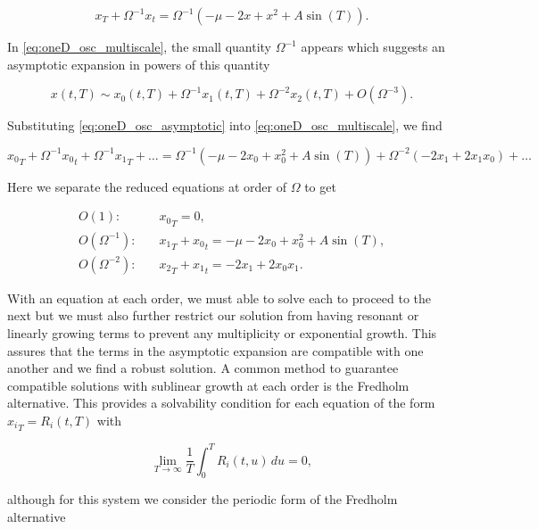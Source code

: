 \begin{equation}\label{eq:oneD_osc_multiscale}
x_T+\Omega^{-1}x_t=\Omega^{-1}\left(-\mu-2x+x^2+A\sin(T)\right).
\end{equation}

In \eqref{eq:oneD_osc_multiscale}, the small quantity $\Omega^{-1}$ appears which suggests an asymptotic expansion in powers of this quantity

\begin{equation}\label{eq:oneD_osc_asymptotic}
x(t,T)\sim x_0(t,T)+\Omega^{-1}x_1(t,T)+\Omega^{-2}x_2(t,T)+O(\Omega^{-3}).
\end{equation}

Substituting \eqref{eq:oneD_osc_asymptotic} into \eqref{eq:oneD_osc_multiscale}, we find

\begin{equation*}
{x_0}_T+\Omega^{-1}{x_0}_t+\Omega^{-1}{x_1}_T+\ldots=\Omega^{-1}(-\mu-2x_0+x_0^2+A\sin(T))+\Omega^{-2}(-2x_1+2x_1x_0)+\ldots
\end{equation*}

Here we separate the reduced equations at order of $\Omega$ to get

\begin{align}
\label{eq:oneD_osc_outerO1}
O(1):& \quad {x_0}_T=0, \\
\label{eq:oneD_osc_outerO2}
O(\Omega^{-1}):& \quad {x_1}_T+{x_0}_t =-\mu-2x_0+x_0^2+A\sin(T),\\
\label{eq:oneD_osc_outerO3}
O(\Omega^{-2}):& \quad {x_2}_T + {x_1}_t= -2x_1+2x_0 x_1.
\end{align}

With an equation at each order, we must able to solve each to proceed to the next but we must also further restrict our solution from having resonant or linearly growing terms to prevent any multiplicity or exponential growth. This assures that the terms in the asymptotic expansion are compatible with one another and we find a robust solution. A common method to guarantee compatible solutions with sublinear growth at each order is the Fredholm alternative. This provides a solvability condition for each equation of the form ${x_i}_T=R_i(t,T)$ with

\begin{equation*}
\lim\limits_{T\to\infty}\frac{1}{T}\int_0^T R_i(t,u)\,du=0,
\end{equation*}

although for this system we consider the periodic form of the Fredholm alternative

